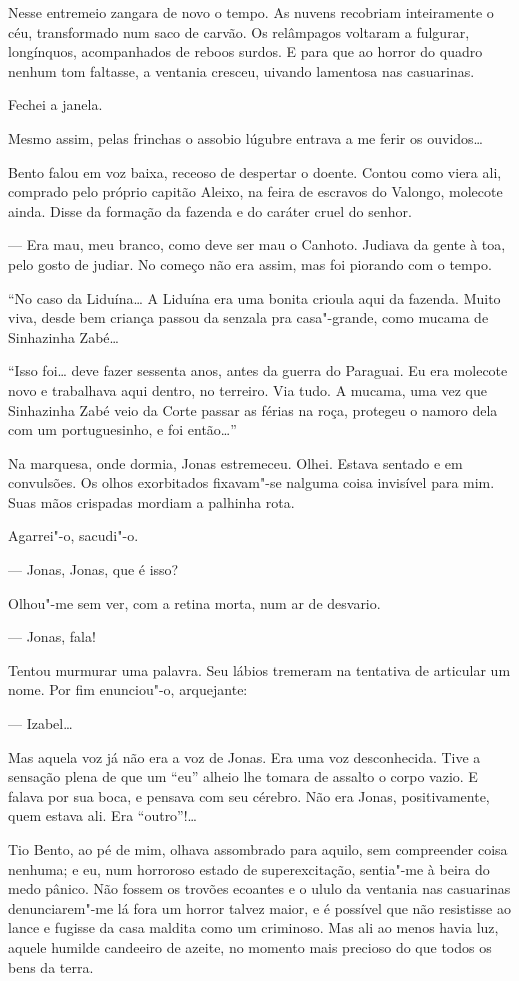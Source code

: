 Nesse entremeio zangara de novo o tempo. As nuvens recobriam
inteiramente o céu, transformado num saco de carvão. Os relâmpagos
voltaram a fulgurar, longínquos, acompanhados de reboos surdos. E para
que ao horror do quadro nenhum tom faltasse, a ventania cresceu, uivando
lamentosa nas casuarinas.

Fechei a janela.

Mesmo assim, pelas frinchas o assobio lúgubre entrava a me ferir os
ouvidos\ldots{}

Bento falou em voz baixa, receoso de despertar o doente. Contou como
viera ali, comprado pelo próprio capitão Aleixo, na feira de escravos do
Valongo, molecote ainda. Disse da formação da fazenda e do caráter cruel
do senhor.

--- Era mau, meu branco, como deve ser mau o Canhoto. Judiava da gente à
toa, pelo gosto de judiar. No começo não era assim, mas foi piorando com
o tempo.

``No caso da Liduína\ldots{} A Liduína era uma bonita crioula aqui da
fazenda. Muito viva, desde bem criança passou da senzala pra
casa"-grande, como mucama de Sinhazinha Zabé\ldots{}

``Isso foi\ldots{} deve fazer sessenta anos, antes da guerra do Paraguai. Eu
era molecote novo e trabalhava aqui dentro, no terreiro. Via tudo. A
mucama, uma vez que Sinhazinha Zabé veio da Corte passar as férias na
roça, protegeu o namoro dela com um portuguesinho, e foi então\ldots{}''

Na marquesa, onde dormia, Jonas estremeceu. Olhei. Estava sentado e em
convulsões. Os olhos exorbitados fixavam"-se nalguma coisa invisível para
mim. Suas mãos crispadas mordiam a palhinha rota.

Agarrei"-o, sacudi"-o.

--- Jonas, Jonas, que é isso?

Olhou"-me sem ver, com a retina morta, num ar de desvario.

--- Jonas, fala!

Tentou murmurar uma palavra. Seu lábios tremeram na tentativa de
articular um nome. Por fim enunciou"-o, arquejante:

--- Izabel\ldots{}

Mas aquela voz já não era a voz de Jonas. Era uma voz desconhecida. Tive
a sensação plena de que um ``eu'' alheio lhe tomara de assalto o corpo
vazio. E falava por sua boca, e pensava com seu cérebro. Não era Jonas,
positivamente, quem estava ali. Era ``outro''!\ldots{}

Tio Bento, ao pé de mim, olhava assombrado para aquilo, sem compreender
coisa nenhuma; e eu, num horroroso estado de superexcitação, sentia"-me à
beira do medo pânico. Não fossem os trovões ecoantes e o ululo da
ventania nas casuarinas denunciarem"-me lá fora um horror talvez maior, e
é possível que não resistisse ao lance e fugisse da casa maldita como um
criminoso. Mas ali ao menos havia luz, aquele humilde candeeiro de
azeite, no momento mais precioso do que todos os bens da terra.

